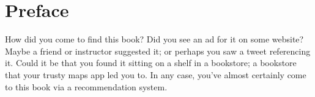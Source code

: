 \documentclass{book}
\begin{document}
    


\frontmatter

\maketitle

\newpage





\tableofcontents




\chapter*{Preface}

How did you come to find this book? Did you see an ad for it on some website? Maybe a friend or instructor suggested it; or perhaps you saw a tweet referencing it. Could it be that you found it sitting on a shelf in a bookstore; a bookstore that your trusty maps app led you to. In any case, you’ve almost certainly come to this book via a recommendation system.
\end{document}
